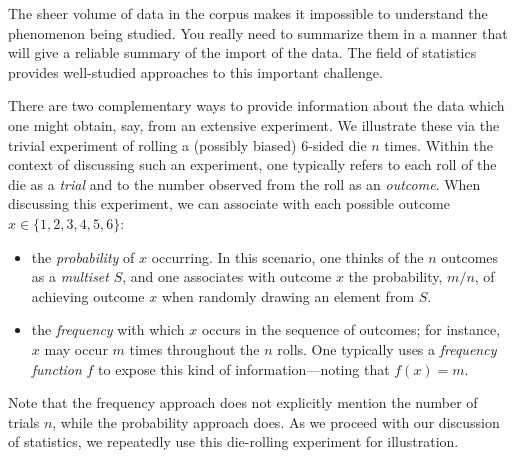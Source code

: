 \bigskip
 
The sheer volume of data in the corpus makes it impossible to understand the phenomenon 
being studied.  You really need to summarize them 
in a manner that will give a reliable summary of the import of the data.  The field of statistics provides well-studied approaches to this important challenge.
 
 \medskip
 
 \noindent {}
 
 \medskip
 
     
There are two complementary ways to provide information about the data which one might obtain,
say, from an extensive experiment.  We illustrate these via the trivial experiment of rolling a
(possibly biased) $6$-sided die $n$ times.  Within the context of discussing such an experiment,
one typically refers to each roll of the die as a {\it trial} and to the number observed from the roll
as an {\it outcome}.  When discussing this experiment, we can associate with each possible
outcome $x \in \{1,2,3,4,5,6\}$:
\begin{itemize}
\item
the {\em probability} of $x$ occurring.  In this scenario, one thinks of the $n$ outcomes as a
{\em multiset} $S$, and one associates with outcome $x$ the probability, $m/n$, of achieving
outcome $x$ when randomly drawing an element from $S$.
\item
the {\em frequency} with which $x$ occurs in the sequence of outcomes; for instance, $x$ may
occur $m$ times throughout the $n$ rolls.  One typically uses a {\em frequency function} $f$ to
expose this kind of information---noting that $f(x) = m$.
\end{itemize}
Note that the frequency approach does not explicitly mention the number of trials $n$, while
the probability approach does.  As we proceed with our discussion of statistics, we repeatedly
use this die-rolling experiment for illustration.  

